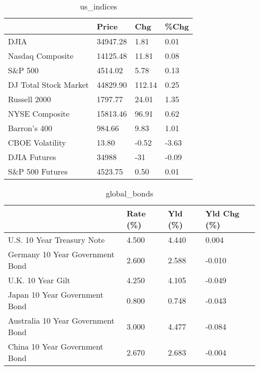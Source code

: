 \documentclass{article}%
\begin{document}
%


\begin{table}[htbp]%
\caption{us\_indices}%
\centering%
\begin{adjustbox}{width=1\textwidth}%
\begin{tabular}{llll}
\toprule
                      &    Price &    Chg &  \%Chg \\
\midrule
                 DJIA & 34947.28 &   1.81 &  0.01 \\
     Nasdaq Composite & 14125.48 &  11.81 &  0.08 \\
              S\&P 500 &  4514.02 &   5.78 &  0.13 \\
DJ Total Stock Market & 44829.90 & 112.14 &  0.25 \\
         Russell 2000 &  1797.77 &  24.01 &  1.35 \\
       NYSE Composite & 15813.46 &  96.91 &  0.62 \\
         Barron's 400 &   984.66 &   9.83 &  1.01 \\
      CBOE Volatility &    13.80 &  -0.52 & -3.63 \\
         DJIA Futures &    34988 &    -31 & -0.09 \\
      S\&P 500 Futures &  4523.75 &   0.50 &  0.01 \\
\bottomrule
\end{tabular}
%
\end{adjustbox}%
\end{table}

%


\begin{table}[htbp]%
\caption{global\_bonds}%
\centering%
\begin{adjustbox}{width=1\textwidth}%
\begin{tabular}{llll}
\toprule
                                  & Rate (\%) & Yld (\%) & Yld Chg (\%) \\
\midrule
       U.S. 10 Year Treasury Note &    4.500 &   4.440 &       0.004 \\
  Germany 10 Year Government Bond &    2.600 &   2.588 &      -0.010 \\
                U.K. 10 Year Gilt &    4.250 &   4.105 &      -0.049 \\
    Japan 10 Year Government Bond &    0.800 &   0.748 &      -0.043 \\
Australia 10 Year Government Bond &    3.000 &   4.477 &      -0.084 \\
    China 10 Year Government Bond &    2.670 &   2.683 &      -0.004 \\
\bottomrule
\end{tabular}
%
\end{adjustbox}%
\end{table}
\end{document}
